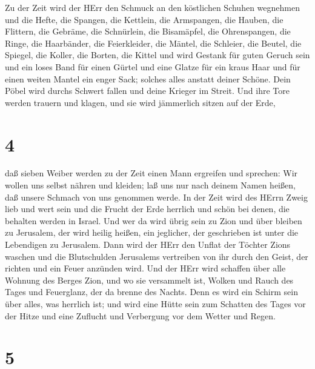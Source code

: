 Zu der Zeit wird der HErr den Schmuck an den köstlichen
Schuhen wegnehmen und die Hefte, die Spangen,  die
Kettlein, die Armspangen, die Hauben,  die Flittern, die
Gebräme, die Schnürlein, die Bisamäpfel, die Ohrenspangen, 
die Ringe, die Haarbänder,  die Feierkleider, die Mäntel,
die Schleier, die Beutel,  die Spiegel, die Koller, die
Borten, die Kittel  und wird Gestank für guten Geruch sein
und ein loses Band für einen Gürtel und eine Glatze für ein kraus Haar
und für einen weiten Mantel ein enger Sack; solches alles anstatt deiner
Schöne.  Dein Pöbel wird durchs Schwert fallen und deine
Krieger im Streit.  Und ihre Tore werden trauern und
klagen, und sie wird jämmerlich sitzen auf der Erde,

\hypertarget{section-3}{%
\section{4}\label{section-3}}

 daß sieben Weiber werden zu der Zeit einen Mann ergreifen
und sprechen: Wir wollen uns selbst nähren und kleiden; laß uns nur nach
deinem Namen heißen, daß unsere Schmach von uns genommen werde.
 In der Zeit wird des HErrn Zweig lieb und wert sein und die
Frucht der Erde herrlich und schön bei denen, die behalten werden in
Israel.  Und wer da wird übrig sein zu Zion und über bleiben
zu Jerusalem, der wird heilig heißen, ein jeglicher, der geschrieben ist
unter die Lebendigen zu Jerusalem.  Dann wird der HErr den
Unflat der Töchter Zions waschen und die Blutschulden Jerusalems
vertreiben von ihr durch den Geist, der richten und ein Feuer anzünden
wird.  Und der HErr wird schaffen über alle Wohnung des
Berges Zion, und wo sie versammelt ist, Wolken und Rauch des Tages und
Feuerglanz, der da brenne des Nachts. Denn es wird ein Schirm sein über
alles, was herrlich ist;  und wird eine Hütte sein zum
Schatten des Tages vor der Hitze und eine Zuflucht und Verbergung vor
dem Wetter und Regen.

\hypertarget{section-4}{%
\section{5}\label{section-4}}


